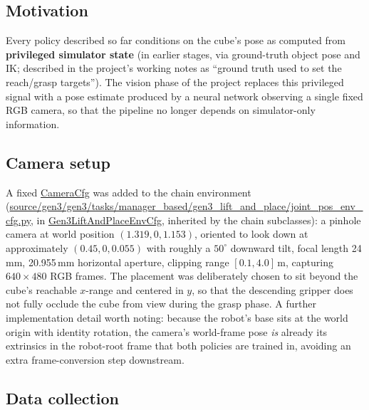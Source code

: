 \documentclass[11pt]{article}
\begin{document}
\subsection{Motivation}

Every policy described so far conditions on the cube's pose as computed from
\textbf{privileged simulator state} (in earlier stages, via ground-truth object
pose and IK; described in the project's working notes as ``ground truth used to
set the reach/grasp targets''). The vision phase of the project replaces this
privileged signal with a pose estimate produced by a neural network observing a
single fixed RGB camera, so that the pipeline no longer depends on simulator-only
information.

\subsection{Camera setup}

A fixed \url{CameraCfg} was added to the chain environment
(\url{source/gen3/gen3/tasks/manager_based/gen3_lift_and_place/joint_pos_env_cfg.py},
in \url{Gen3LiftAndPlaceEnvCfg}, inherited by the chain subclasses): a pinhole camera at
world position $(1.319, 0, 1.153)$, oriented to look down at approximately
$(0.45, 0, 0.055)$ with roughly a $50^\circ$ downward tilt, focal length 24\,mm,
20.955\,mm horizontal aperture, clipping range $[0.1, 4.0]$\,m, capturing
$640\times480$ RGB frames. The placement was deliberately chosen to sit beyond the
cube's reachable $x$-range and centered in $y$, so that the descending gripper
does not fully occlude the cube from view during the grasp phase. A further
implementation detail worth noting: because the robot's base sits at the world
origin with identity rotation, the camera's world-frame pose \emph{is} already its
extrinsics in the robot-root frame that both policies are trained in, avoiding an
extra frame-conversion step downstream.

\subsection{Data collection}
\end{document}
